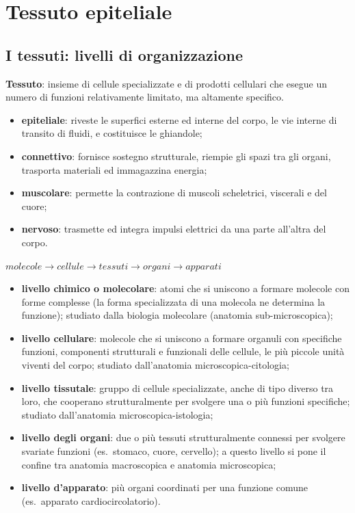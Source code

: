 \section{Tessuto epiteliale}

\subsection{I tessuti: livelli di organizzazione}

\textbf{Tessuto}: insieme di cellule specializzate e di prodotti cellulari che esegue un numero di funzioni relativamente limitato, ma altamente specifico.

\begin{itemize}
  \item \textbf{epiteliale}: riveste le superfici esterne ed interne del corpo, le vie interne di transito di fluidi, e costituisce le ghiandole;
  \item \textbf{connettivo}: fornisce sostegno strutturale, riempie gli spazi tra gli organi, trasporta materiali ed immagazzina energia;
  \item \textbf{muscolare}: permette la contrazione di muscoli scheletrici, viscerali e del cuore;
  \item \textbf{nervoso}: trasmette ed integra impulsi elettrici da una parte all'altra del corpo.
\end{itemize}

$molecole \rightarrow cellule \rightarrow tessuti \rightarrow organi \rightarrow apparati$
\begin{itemize}
  \item \textbf{livello chimico o molecolare}: atomi che si uniscono a formare molecole con forme complesse (la forma specializzata di una molecola ne determina la funzione); studiato dalla biologia molecolare (anatomia sub-microscopica);
  \item \textbf{livello cellulare}: molecole che si uniscono a formare organuli con specifiche funzioni, componenti strutturali e funzionali delle cellule, le più piccole unità viventi del corpo; studiato dall'anatomia microscopica-citologia;
  \item \textbf{livello tissutale}: gruppo di cellule specializzate, anche di tipo diverso tra loro, che cooperano strutturalmente per svolgere una o più funzioni specifiche; studiato dall'anatomia microscopica-istologia;
  \item \textbf{livello degli organi}: due o più tessuti strutturalmente connessi per svolgere svariate funzioni (es.\ stomaco, cuore, cervello); a questo livello si pone il confine tra anatomia macroscopica e anatomia microscopica;
  \item \textbf{livello d'apparato}: più organi coordinati per una funzione comune (es.\ apparato cardiocircolatorio).
\end{itemize}

